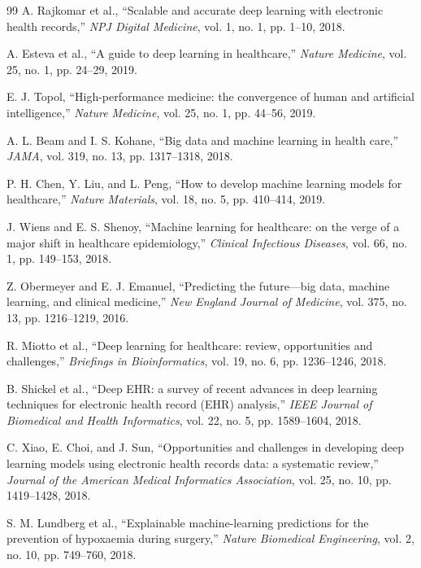 \documentclass[conference]{IEEEtran}
\begin{document}
\begin{thebibliography}{99}
A. Rajkomar et al., ``Scalable and accurate deep learning with electronic health records,'' \textit{NPJ Digital Medicine}, vol. 1, no. 1, pp. 1--10, 2018.

A. Esteva et al., ``A guide to deep learning in healthcare,'' \textit{Nature Medicine}, vol. 25, no. 1, pp. 24--29, 2019.

E. J. Topol, ``High-performance medicine: the convergence of human and artificial intelligence,'' \textit{Nature Medicine}, vol. 25, no. 1, pp. 44--56, 2019.

A. L. Beam and I. S. Kohane, ``Big data and machine learning in health care,'' \textit{JAMA}, vol. 319, no. 13, pp. 1317--1318, 2018.

P. H. Chen, Y. Liu, and L. Peng, ``How to develop machine learning models for healthcare,'' \textit{Nature Materials}, vol. 18, no. 5, pp. 410--414, 2019.

J. Wiens and E. S. Shenoy, ``Machine learning for healthcare: on the verge of a major shift in healthcare epidemiology,'' \textit{Clinical Infectious Diseases}, vol. 66, no. 1, pp. 149--153, 2018.

Z. Obermeyer and E. J. Emanuel, ``Predicting the future—big data, machine learning, and clinical medicine,'' \textit{New England Journal of Medicine}, vol. 375, no. 13, pp. 1216--1219, 2016.

R. Miotto et al., ``Deep learning for healthcare: review, opportunities and challenges,'' \textit{Briefings in Bioinformatics}, vol. 19, no. 6, pp. 1236--1246, 2018.

B. Shickel et al., ``Deep EHR: a survey of recent advances in deep learning techniques for electronic health record (EHR) analysis,'' \textit{IEEE Journal of Biomedical and Health Informatics}, vol. 22, no. 5, pp. 1589--1604, 2018.

C. Xiao, E. Choi, and J. Sun, ``Opportunities and challenges in developing deep learning models using electronic health records data: a systematic review,'' \textit{Journal of the American Medical Informatics Association}, vol. 25, no. 10, pp. 1419--1428, 2018.

S. M. Lundberg et al., ``Explainable machine-learning predictions for the prevention of hypoxaemia during surgery,'' \textit{Nature Biomedical Engineering}, vol. 2, no. 10, pp. 749--760, 2018.


\end{thebibliography}
\end{document}
